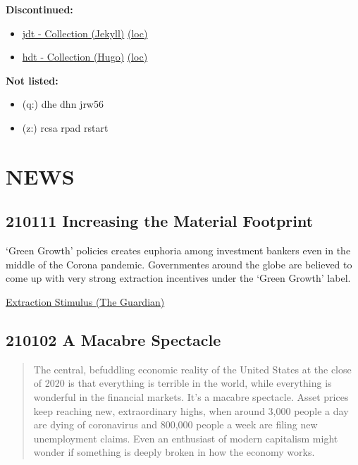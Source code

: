 \documentclass[
]{book}
\providecommand{\tightlist}{%
  \setlength{\itemsep}{0pt}\setlength{\parskip}{0pt}}
\begin{document}
\textbf{Discontinued:}

\begin{itemize}
\tightlist
\item
  \href{https://dyrehaugen.github.io/jdt}{jdt - Collection (Jekyll)} \href{http://localhost/jdt}{(loc)}
\item
  \href{https://dyrehaugen.github.io/hdt}{hdt - Collection (Hugo)} \href{http://localhost/hdt}{(loc)}
\end{itemize}

\textbf{Not listed:}

\begin{itemize}
\tightlist
\item
  (q:) dhe dhn jrw56
\item
  (z:) rcsa rpad rstart
\end{itemize}

\hypertarget{news}{%
\chapter{NEWS}\label{news}}

\hypertarget{increasing-the-material-footprint}{%
\section{210111 Increasing the Material Footprint}\label{increasing-the-material-footprint}}

`Green Growth' policies creates euphoria among investment bankers
even in the middle of the Corona pandemic.
Governmentes around the globe are believed to come up with very
strong extraction incentives under the `Green Growth' label.

\href{https://www.theguardian.com/business/2021/jan/10/green-economy-plans-fuel-new-metals-and-energy-supercycle}{Extraction Stimulus (The Guardian)}

\hypertarget{a-macabre-spectacle}{%
\section{210102 A Macabre Spectacle}\label{a-macabre-spectacle}}

\begin{quote}
The central, befuddling economic reality of the United States at the close of 2020 is that everything is terrible in the world, while everything is wonderful in the financial markets.
It's a macabre spectacle. Asset prices keep reaching new, extraordinary highs, when around 3,000 people a day are dying of coronavirus and 800,000 people a week are filing new unemployment claims. Even an enthusiast of modern capitalism might wonder if something is deeply broken in how the economy works.
\end{quote}
\end{document}

